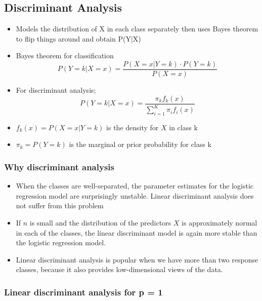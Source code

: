 \documentclass{article}
\begin{document}
\subsection{Discriminant Analysis}
\begin{itemize}
    \item Models the distribution of X in each class separately then uses Bayes theorem to flip things around and obtain P(Y|X)
    \item Bayes theorem for classification
    \begin{equation*}
        P(Y=k|X=x) = \frac{P(X=x|Y=k) \cdot P(Y=k)}{P(X=x)}
    \end{equation*}
    \item For discriminant analysis;
    \begin{equation*}
        P(Y=k|X=x) = \frac{\pi_k f_k(x)}{\sum_{i=1}^K \pi_i f_i(x)}
    \end{equation*}
    \item $f_k(x) = P(X=x|Y=k)$ is the density for $X$ in class k
    \item $\pi_k = P(Y=k)$ is the marginal or prior probability for class k 
\end{itemize}

\subsubsection{Why discriminant analysis}
\begin{itemize}
    \item When the classes are well-separated, the parameter estimates for the logistic regression model are surprisingly unstable. Linear discriminant analysis does not suffer from this problem
    \item If $n$ is small and the distribution of the predictors $X$ is approximately normal in each of the classes, the linear discriminant model is again more stable than the logistic regression model.
    \item Linear discriminant analysis is popular when we have more than two response classes, because it also provides low-dimensional views of the data.
\end{itemize}

\subsubsection{Linear discriminant analysis for p = 1}
\end{document}
